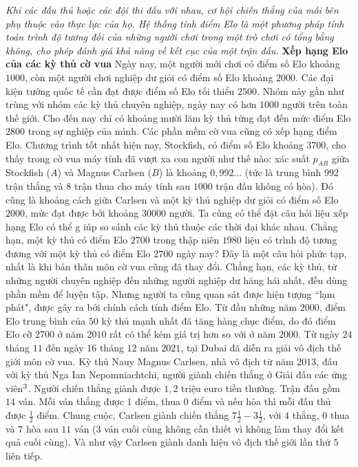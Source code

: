 \vspace*{200pt}

\begin{multicols}{2}
	\textit{Khi các đấu thủ hoặc các đội thi đấu với nhau, cơ hội chiến thắng của mỗi bên phụ thuộc vào thực lực của họ. Hệ thống tính điểm Elo là một phương pháp tính toán trình độ tương đối của những người chơi trong một trò chơi có tổng bằng không, cho phép đánh giá khả năng về kết cục của một trận đấu.}
	\vskip 0.05cm
	\textbf{\color{toanhocdoisong}Xếp hạng Elo của các kỳ thủ cờ vua}
	\vskip 0.05cm
	Ngày nay, một người mới chơi có điểm số Elo khoảng $1000$, còn một người chơi nghiệp dư giỏi có điểm số Elo khoảng $2000$. Các đại kiện tướng quốc tế cần đạt được điểm số Elo tối thiểu $2500$. Nhóm này gần như trùng với nhóm các kỳ thủ chuyên nghiệp, ngày nay có hơn $1000$ người trên toàn thế giới. Cho đến nay chỉ có khoảng mười lăm kỳ thủ từng đạt đến mức điểm Elo $2800$ trong sự nghiệp của mình.
	\vskip 0.05cm
	Các phần mềm cờ vua cũng có xếp hạng điểm Elo. Chương trình tốt nhất hiện nay, Stockfish, có điểm số Elo khoảng $3700$, cho thấy trong cờ vua máy tính đã vượt xa con người như thế nào: xác suất $p_{AB}$ giữa Stockfish ($A$) và Magnus Carlsen ($B$) là khoảng $0{,}992\ldots$ (tức là trung bình $992$ trận thắng và $8$ trận thua cho máy tính sau $1000$ trận đấu không có hòa). Đó cũng là khoảng cách giữa Carlsen và một kỳ thủ nghiệp dư giỏi có điểm số Elo $2000$, mức đạt được bởi khoảng $30000$ người.
	\vskip 0.05cm
	Ta cũng có thể đặt câu hỏi liệu xếp hạng Elo có thể g  iúp so sánh các kỳ thủ thuộc các thời đại khác nhau. Chẳng hạn, một kỳ thủ có điểm Elo $2700$ trong thập niên $1980$ liệu có trình độ tương đương với một kỳ thủ có điểm Elo $2700$ ngày nay? Đây là một câu hỏi phức tạp, nhất là khi bản thân môn cờ vua cũng đã thay đổi. Chẳng hạn, các kỳ thủ, từ những người chuyên nghiệp đến những người nghiệp dư hăng hái nhất, đều dùng phần mềm để luyện tập. Nhưng người ta cũng quan sát được hiện tượng ``lạm phát", được gây ra bởi chính cách tính điểm Elo. Từ đầu những năm $2000$, điểm Elo trung bình của $50$ kỳ thủ mạnh nhất đã tăng hàng chục điểm, do đó điểm Elo cỡ $2700$ ở năm $2010$ rất có thể kém giá trị hơn so với ở năm $2000$.
	\vskip 0.05cm
	Từ ngày $24$ tháng $11$ đến ngày $16$ tháng $12$ năm $2021$, tại Dubai đã diễn ra giải vô địch thế giới môn cờ vua. Kỳ thủ Nauy Magnus Carlsen, nhà vô địch từ năm $2013$, đấu với kỳ thủ Nga Ian Nepomniachtchi, người giành chiến thắng ở Giải đấu các ứng viên$^{\small{3}}$. Người chiến thắng giành được $1{,}2$ triệu euro tiền thưởng.
	\vskip 0.05cm
	Trận đấu gồm $14$ ván. Mỗi ván thắng được $1$ điểm, thua $0$ điểm và nếu hòa thì mỗi đấu thủ được $\frac{1}{2}$ điểm. Chung cuộc, Carlsen giành chiến thắng $7\frac{1}{2} - 3\frac{1}{2}$, với $4$ thắng, $0$ thua và $7$ hòa sau $11$ ván ($3$ ván cuối cùng không cần thiết vì không làm thay đổi kết quả cuối cùng). Và như vậy Carlsen giành danh hiệu vô địch thế giới lần thứ $5$ liên tiếp.

\end{multicols}
